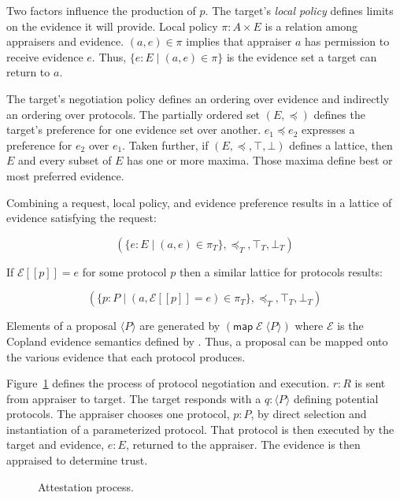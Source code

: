 \documentclass[sigconf,authordraft]{acmart}
\begin{document}
Two factors influence the production of $p$.  The target's \emph{local
  policy} defines limits on the evidence it will provide.  Local
policy $\pi : A\times E$ is a relation among appraisers and evidence.
$(a,e)\in\pi$ implies that appraiser $a$ has permission to receive
evidence $e$.  Thus, $\{e:E\mid (a,e)\in\pi\}$ is the evidence set a
target can return to $a$.

The target's negotiation policy defines an ordering over evidence and
indirectly an ordering over protocols.  The partially ordered set
$(E,\preceq)$ defines the target's preference for one evidence set
over another. $e_1\preceq e_2$ expresses a preference for $e_2$ over
$e_1$.  Taken further, if $(E,\preceq,\top,\bot)$ defines a lattice,
then $E$ and every subset of $E$ has one or more maxima.  Those maxima
define best or most preferred evidence.

Combining a request, local policy, and evidence preference results in
a lattice of evidence satisfying the request:

\[(\{e:E\mid (a,e)\in\pi_T\},\preceq_T,\top_T,\bot_T)\]

If $\mathcal{E}[\![p]\!]=e$ for some protocol $p$ then a similar
lattice for protocols results:

\[(\{p:P\mid
  (a,\mathcal{E}[\![p]\!]=e)\in\pi_T\},\preceq_T,\top_T,\bot_T)\]


Elements of a proposal $\langle P\rangle$ are generated by
$(\mathsf{map}\; \mathcal{E}\; \langle P\rangle)$ where $\mathcal{E}$
is the Copland evidence semantics defined by \citet{Ramsdell:2019aa}.
Thus, a proposal can be mapped onto the various evidence that each
protocol produces.

Figure~\ref{fig:sequence-fig} defines the process of protocol
negotiation and execution.  $r:R$ is sent from appraiser to target.
The target responds with a $q:\langle P\rangle$ defining potential
protocols.  The appraiser chooses one protocol, $p:P$, by direct
selection and instantiation of a parameterized protocol.  That
protocol is then executed by the target and evidence, $e:E$, returned
to the appraiser.  The evidence is then appraised to determine trust.

\begin{figure}[hbtp]
  \centering 
  \caption[Attestation process]{Attestation process.}
  \label{fig:sequence-fig}
\end{figure}
\end{document}
